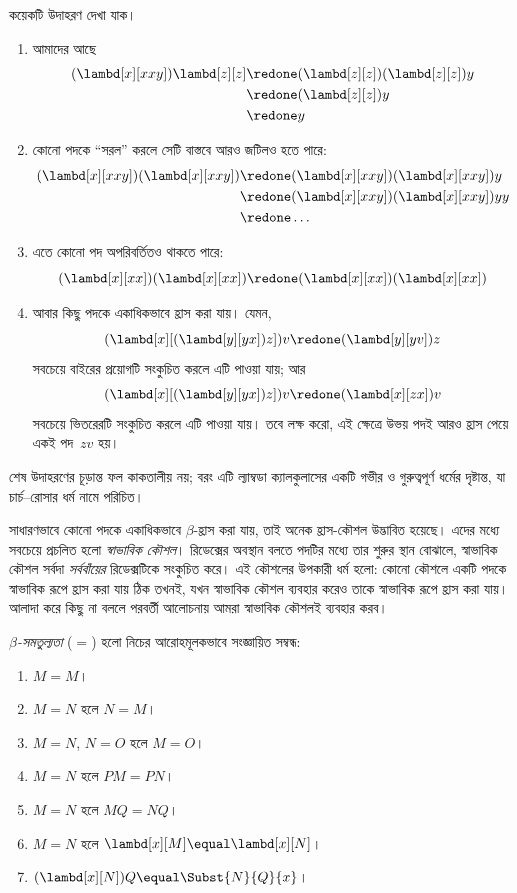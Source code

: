 \documentclass[../../../include/open-logic-section]{subfiles}
\begin{document}
কয়েকটি উদাহরণ দেখা যাক।
\begin{enumerate}
\item আমাদের আছে
\begin{align*}
(\lambd[x][xxy]) \lambd[z][z] & \redone (\lambd[z][z])(\lambd[z][z]) y \\
& \redone (\lambd[z][z]) y \\
& \redone y
\end{align*}
\item কোনো পদকে “সরল” করলে সেটি বাস্তবে আরও জটিলও হতে পারে:
\begin{align*}
(\lambd[x][xxy])(\lambd[x][xxy]) & \redone (\lambd[x][xxy])(\lambd[x][xxy])y \\
& \redone (\lambd[x][xxy])(\lambd[x][xxy])yy \\
& \redone \dots
\end{align*}
\item এতে কোনো পদ অপরিবর্তিতও থাকতে পারে:
\[
(\lambd[x][xx])(\lambd[x][xx]) \redone (\lambd[x][xx])(\lambd[x][xx])
\]
\item আবার কিছু পদকে একাধিকভাবে হ্রাস করা যায়। যেমন,
\[
(\lambd[x][(\lambd[y][yx]) z]) v \redone (\lambd[y][yv]) z
\]
সবচেয়ে বাইরের প্রয়োগটি সংকুচিত করলে এটি পাওয়া যায়; আর
\[
(\lambd[x][(\lambd[y][yx]) z]) v \redone (\lambd[x][zx]) v
\]
সবচেয়ে ভিতরেরটি সংকুচিত করলে এটি পাওয়া যায়। তবে লক্ষ করো, এই
ক্ষেত্রে উভয় পদই আরও হ্রাস পেয়ে একই পদ~$zv$ হয়।
\end{enumerate}

শেষ উদাহরণের চূড়ান্ত ফল কাকতালীয় নয়; বরং এটি ল্যাম্বডা ক্যালকুলাসের
একটি গভীর ও গুরুত্বপূর্ণ ধর্মের দৃষ্টান্ত, যা চার্চ--রোসার ধর্ম নামে
পরিচিত।

\begin{digress}
  সাধারণভাবে কোনো পদকে একাধিকভাবে $\beta$-হ্রাস করা যায়, তাই অনেক
  হ্রাস-কৌশল উদ্ভাবিত হয়েছে। এদের মধ্যে সবচেয়ে প্রচলিত হলো
  \emph{স্বাভাবিক কৌশল}। রিডেক্সের অবস্থান বলতে পদটির মধ্যে তার
  শুরুর স্থান বোঝালে, স্বাভাবিক কৌশল সর্বদা \emph{সর্ববাঁয়ের}
  রিডেক্সটিকে সংকুচিত করে। এই কৌশলের উপকারী ধর্ম হলো: কোনো কৌশলে
  একটি পদকে স্বাভাবিক রূপে হ্রাস করা যায় ঠিক তখনই, যখন স্বাভাবিক
  কৌশল ব্যবহার করেও তাকে স্বাভাবিক রূপে হ্রাস করা যায়। আলাদা করে
  কিছু না বললে পরবর্তী আলোচনায় আমরা স্বাভাবিক কৌশলই ব্যবহার করব।
\end{digress}

\begin{defn}
  \emph{$\beta$-সমতুল্যতা} ($\equal$) হলো নিচের আরোহমূলকভাবে
  সংজ্ঞায়িত সম্বন্ধ:
  \begin{enumerate}
  \item $M \equal M$।
  \item $M \equal N$ হলে $N \equal M$।
  \item $M \equal N$, $N \equal O$ হলে $M \equal O$।
  \item $M \equal N$ হলে $PM \equal PN$।
  \item $M \equal N$ হলে $MQ \equal NQ$।
  \item $M \equal N$ হলে $\lambd[x][M] \equal \lambd[x][N]$।
  \item $(\lambd[x][N])Q \equal \Subst{N}{Q}{x}$।
  \end{enumerate}
\end{defn}
\end{document}
